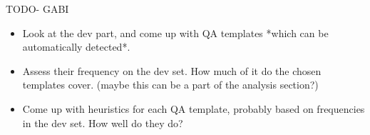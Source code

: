 TODO- GABI

\begin{itemize}
\item
  Look at the dev part, and come up with QA templates
  *which can be automatically detected*.
\item
  Assess their frequency on the dev set. How much of it do the chosen templates cover.
  (maybe this can be a part of the analysis section?)
\item
  Come up with heuristics for each QA template, probably based on frequencies in
  the dev set.
  How well do they do?
\end{itemize}
